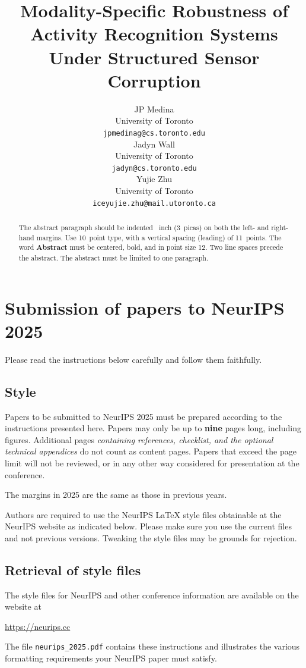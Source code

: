 \documentclass{article}
\title{Modality-Specific Robustness of Activity Recognition Systems Under Structured Sensor Corruption}
\author{%
JP Medina \\
University of Toronto \\
\texttt{jpmedinag@cs.toronto.edu} \\
\And
Jadyn Wall \\
University of Toronto \\
\texttt{jadyn@cs.toronto.edu} \\
\And
Yujie Zhu \\
University of Toronto \\
\texttt{iceyujie.zhu@mail.utoronto.ca} \\
}
\begin{document}
\maketitle


\begin{abstract}
  The abstract paragraph should be indented ~inch (3~picas) on
  both the left- and right-hand margins. Use 10~point type, with a vertical
  spacing (leading) of 11~points.  The word \textbf{Abstract} must be centered,
  bold, and in point size 12. Two line spaces precede the abstract. The abstract
  must be limited to one paragraph.
\end{abstract}


\section{Submission of papers to NeurIPS 2025}


Please read the instructions below carefully and follow them faithfully.


\subsection{Style}


Papers to be submitted to NeurIPS 2025 must be prepared according to the
instructions presented here. Papers may only be up to {\bf nine} pages long,
including figures.
Additional pages \emph{containing references, checklist, and the optional technical appendices} do not count as content pages.
Papers that exceed the page limit will not be
reviewed, or in any other way considered for presentation at the conference.


The margins in 2025 are the same as those in previous years.


Authors are required to use the NeurIPS \LaTeX{} style files obtainable at the
NeurIPS website as indicated below. Please make sure you use the current files
and not previous versions. Tweaking the style files may be grounds for
rejection.


\subsection{Retrieval of style files}


The style files for NeurIPS and other conference information are available on
the website at
\begin{center}
  \url{https://neurips.cc}
\end{center}
The file \verb+neurips_2025.pdf+ contains these instructions and illustrates the
various formatting requirements your NeurIPS paper must satisfy.
\end{document}
